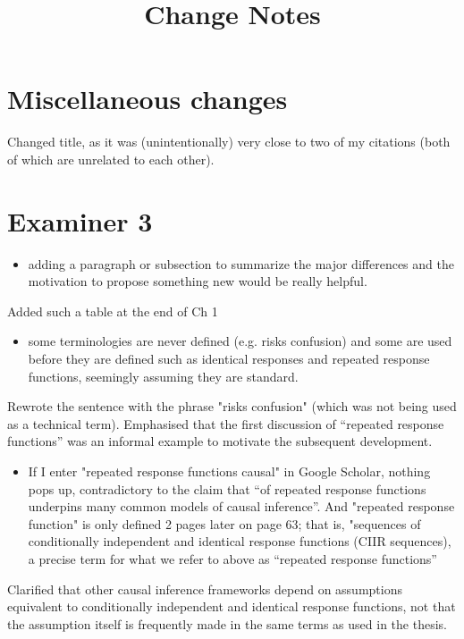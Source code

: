 \documentclass[12pt, a4paper]{article}
\title{Change Notes}
\begin{document}
\maketitle
\section{Miscellaneous changes}

Changed title, as it was (unintentionally) very close to two of my citations (both of which are unrelated to each other).

\section{Examiner 3}
\begin{itemize}
    \item adding a paragraph or subsection to summarize the major differences and the motivation to propose something new would be really helpful.
\end{itemize}

Added such a table at the end of Ch 1

\begin{itemize}
    \item some terminologies are never defined (e.g. risks confusion) and some are used before they are defined such as identical responses and repeated response functions, seemingly assuming they are standard.
\end{itemize}


Rewrote the sentence with the phrase "risks confusion" (which was not being used as a technical term). Emphasised that the first discussion of ``repeated response functions'' was an informal example to motivate the subsequent development.

\begin{itemize}
    \item If I enter "repeated response functions causal" in Google Scholar, nothing pops up, contradictory to the claim that “of repeated response functions underpins many common models of causal inference”. And "repeated response function" is only defined 2 pages later on page 63; that is, "sequences of conditionally independent and identical response functions (CIIR sequences), a precise term for what we refer to above as “repeated response functions”
\end{itemize}

Clarified that other causal inference frameworks depend on assumptions equivalent to conditionally independent and identical response functions, not that the assumption itself is frequently made in the same terms as used in the thesis.
\end{document}
